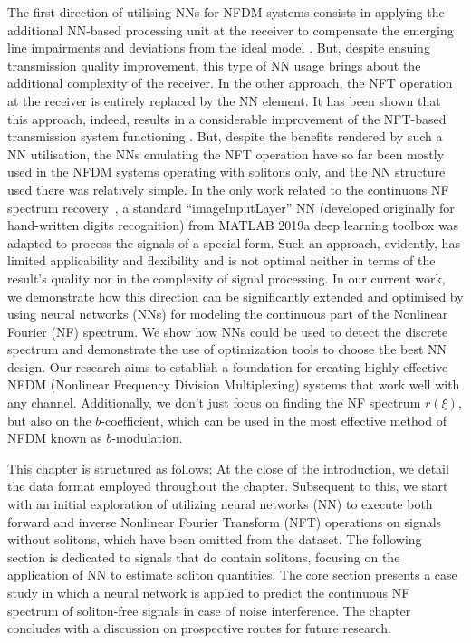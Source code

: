 The first direction of utilising NNs for NFDM systems consists in applying the additional NN-based processing unit at the receiver to compensate the emerging line impairments and deviations from the ideal model \cite{gdd18,kwp19,kkp19,kpk20,kkp21}. But, despite ensuing transmission quality improvement, this type of NN usage brings about the additional complexity of the receiver. In the other approach, the NFT operation at the receiver is entirely replaced by the NN element. It has been shown that this approach, indeed, results in a considerable improvement of the NFT-based transmission system functioning \cite{ymm19,jgy18,wxz20}. But, despite the benefits rendered by such a NN utilisation, the NNs emulating the NFT operation have so far been mostly used in the NFDM systems operating with solitons only, and the NN structure used there was relatively simple.  In the only work related to the continuous NF spectrum recovery~\cite{zhang2021direct}, a standard ``imageInputLayer'' NN (developed originally for hand-written digits recognition) from MATLAB 2019a deep learning toolbox was adapted to process the signals of a special form. Such an approach, evidently, has limited applicability and flexibility and is not optimal neither in terms of the result's quality nor in the complexity of signal processing. 
In our current work, we demonstrate how this direction can be significantly extended and optimised by using neural networks (NNs) for modeling the continuous part of the Nonlinear Fourier (NF) spectrum. We show how NNs could be used to detect the discrete spectrum and demonstrate the use of optimization tools to choose the best NN design. Our research aims to establish a foundation for creating highly effective NFDM (Nonlinear Frequency Division Multiplexing) systems that work well with any channel. Additionally, we don't just focus on finding the NF spectrum \( r(\xi) \), but also on the \( b \)-coefficient, which can be used in the most effective method of NFDM known as \( b \)-modulation.


This chapter is structured as follows: At the close of the introduction, we detail the data format employed throughout the chapter. Subsequent to this, we start with an initial exploration of utilizing neural networks (NN) to execute both forward and inverse Nonlinear Fourier Transform (NFT) operations on signals without solitons, which have been omitted from the dataset. The following section is dedicated to signals that do contain solitons, focusing on the application of NN to estimate soliton quantities. The core section presents a case study in which a neural network is applied to predict the continuous NF spectrum of soliton-free signals in case of noise interference. The chapter concludes with a discussion on prospective routes for future research.


